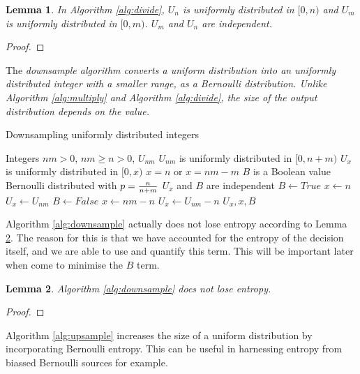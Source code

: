 \documentclass[12pt]{article}
\newtheorem{lemma}{Lemma}
\begin{document}
\begin{lemma}
In Algorithm \ref{alg:divide}, $U_n$ is uniformly distributed in $[0,n)$ and $U_m$ is uniformly distributed in $[0,m)$.
$U_m$ and $U_n$ are independent.
\end{lemma}

\begin{proof}
\end{proof}

The \em downsample \em algorithm converts a uniform distribution into an uniformly distributed integer with a smaller range, as a Bernoulli distribution. Unlike Algorithm \ref{alg:multiply} and Algorithm \ref{alg:divide}, the size of the output distribution depends on the value.

\begin{algorithm}
\caption{Downsampling uniformly distributed integers}
\label{alg:downsample}
\begin{algorithmic}[1]
    \Require Integers $nm>0$, $nm \ge n>0$, $U_{nm}$
    \Require $U_{nm}$ is uniformly distributed in $[0,n+m)$
\Ensure $U_{x}$ is uniformly distributed in $[0,x)$
\Ensure $x = n$ or $x=nm-m$
\Ensure $B$ is a Boolean value Bernoulli distributed with $p={n\over n+m}$
\Ensure $U_x$ and $B$ are independent
    \State $B \gets True$  
    \State $x \gets n$
    \State $U_x \gets U_{nm}$
  \Else
    \State $B \gets False$  
    \State $x \gets nm-n$
    \State $U_x \gets U_{nm}-n$
  \EndIf
  \State \Return $U_x, x, B$
\EndProcedure
\end{algorithmic}
\end{algorithm}

Algorithm \ref{alg:downsample} actually does not lose entropy according to Lemma \ref{lem:downsample}. The reason for this is that we have accounted for the entropy of the decision itself, and we are able to use and quantify this term. This will be important later when come to minimise the $B$ term.

\begin{lemma}
\label{lem:downsample}
Algorithm \ref{alg:downsample} does not lose entropy.
\end{lemma}

\begin{proof}
\end{proof}

Algorithm \ref{alg:upsample} increases the size of a uniform distribution by incorporating Bernoulli entropy. This can be useful in harnessing entropy from biassed Bernoulli sources for example.
\end{document}
